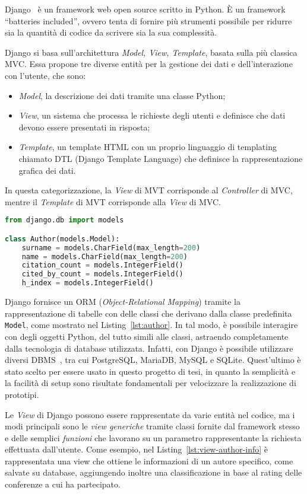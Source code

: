 Django~\cite{django} è un framework web open source scritto in Python. È
un framework ``batteries included'', ovvero tenta di fornire più strumenti
possibile per ridurre sia la quantità di codice da scrivere sia la sua
complessità.

Django si basa sull'architettura \textit{Model, View, Template}, basata sulla più
classica MVC. Essa propone tre diverse entità per la gestione dei dati e dell'interazione
con l'utente, che sono:
\begin{itemize}
	\item \textit{Model}, la descrizione dei dati tramite una classe Python;
	\item \textit{View}, un sistema che processa le richieste degli utenti e
	definisce che dati devono essere presentati in risposta;
	\item \textit{Template}, un template HTML con un proprio linguaggio di templating
	chiamato DTL (Django Template Language) che definisce la rappresentazione
	grafica dei dati.
\end{itemize}
In questa categorizzazione, la \textit{View} di MVT corrisponde al \textit{Controller}
di MVC, mentre il \textit{Template} di MVT corrisponde alla \textit{View} di MVC.

\begin{lstlisting}[language=Python, caption=La classe \texttt{Author}, label=lst:author]
from django.db import models

class Author(models.Model):
    surname = models.CharField(max_length=200)
    name = models.CharField(max_length=200)
    citation_count = models.IntegerField()
    cited_by_count = models.IntegerField()
    h_index = models.IntegerField()
\end{lstlisting}

Django fornisce un ORM (\textit{Object-Relational Mapping}) tramite la
rappresentazione di tabelle con delle classi che derivano dalla classe
predefinita \texttt{Model}, come mostrato nel Listing~\ref{lst:author}. In
tal modo, è possibile interagire con degli oggetti Python, del tutto simili
alle classi, astraendo completamente dalla tecnologia di database utilizzata.
Infatti, con Django è possibile utilizzare diversi DBMS~\cite{djangoDBMS}, tra cui PostgreSQL,
MariaDB, MySQL e SQLite. Quest'ultimo è stato scelto per essere usato in questo
progetto di tesi, in quanto la semplicità e la facilità di setup sono risultate
fondamentali per velocizzare la realizzazione di prototipi.

Le \textit{View} di Django possono essere rappresentate da varie entità nel codice,
ma i modi principali sono le \textit{view generiche} tramite classi fornite dal framework
stesso e delle semplici \textit{funzioni} che lavorano su un parametro rappresentante
la richiesta effettuata dall'utente. Come esempio, nel Listing~\ref{lst:view-author-info}
è rappresentata una view che ottiene le informazioni di un autore specifico,
come salvate su database, aggiungendo inoltre una classificazione in base al
rating delle conferenze a cui ha partecipato.

